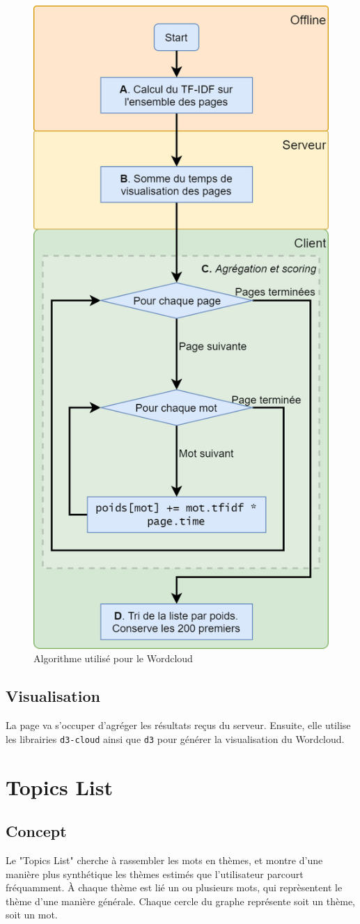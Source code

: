 		\begin{figure}[!h]
			\centering
			\includegraphics[height=1\textwidth]{images/design/pages/wordcloud_algo}
			\caption{Algorithme utilisé pour le Wordcloud}
			\label{wordcloud_algo}
		\end{figure}

	\subsection{Visualisation}

			La page va s'occuper d'agréger les résultats reçus du serveur. Ensuite, elle utilise les librairies \texttt{d3-cloud} ainsi que \texttt{d3} pour générer la visualisation du Wordcloud.

\clearpage

%
%
%
%

\section{Topics List}\label{topicslist}

	\subsection{Concept}

		Le "Topics List" cherche à rassembler les mots en thèmes, et montre d'une manière plus synthétique les thèmes estimés que l'utilisateur parcourt fréquamment. À chaque thème est lié un ou plusieurs mots, qui reprèsentent le thème d'une manière générale. Chaque cercle du graphe représente soit un thème, soit un mot.

